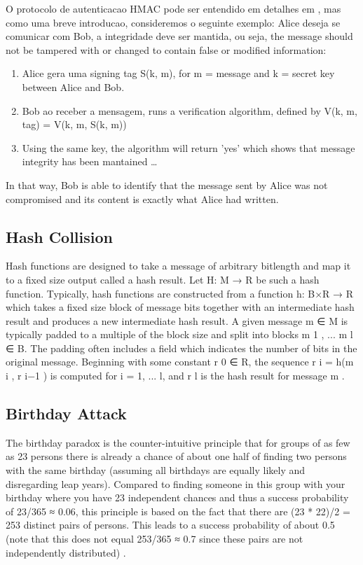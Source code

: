 \documentclass[letterpaper,conference]{IEEEtran}
\begin{document}
O protocolo de autenticacao HMAC pode ser entendido em detalhes em \cite{krawczyk1997hmac}, mas como uma breve
introducao, consideremos o seguinte exemplo: Alice deseja se comunicar com Bob, a integridade deve ser
mantida, ou seja, the message should not be tampered with or changed to contain false or modified information:
\begin{enumerate}
\item Alice gera uma signing tag S(k, m), for m = message and k = secret key between Alice and Bob.
\item Bob ao receber a mensagem, runs a verification algorithm, defined by V(k, m, tag) = V(k, m, S(k, m))
\item Using the same key, the algorithm will return 'yes' which shows that message integrity has been mantained \ldots
\end{enumerate}

In that way, Bob is able to identify that the message sent by Alice was not compromised and its content
is exactly what Alice had written.

\subsection{Hash Collision}

Hash functions are designed to take a message of arbitrary bitlength and map it to a fixed size
output called a hash result. Let H: M → R be such a hash function. Typically, hash functions are
constructed from a function h: B×R → R which takes a fixed size block of message bits together
with an intermediate hash result and produces a new intermediate hash result. A given message
m ∈ M is typically padded to a multiple of the block size and split into blocks m 1 , ... m l ∈ B. The
padding often includes a field which indicates the number of bits in the original message.
Beginning with some constant r 0 ∈ R, the sequence r i = h(m i , r i−1 ) is computed for i = 1, ... l, and
r l is the hash result for message m \cite{van1999parallel}.

\subsection{Birthday Attack}

The birthday paradox is the counter-intuitive principle that for
groups of as few as 23 persons there is already a chance of about one half of finding two 
persons with the same birthday (assuming all birthdays are equally likely and disregarding 
leap years). Compared to finding someone in this group with your birthday where you have 
23 independent chances and thus a success probability of 23/365 ≈ 0.06, this principle is 
based on the fact that there are (23 * 22)/2 = 253 distinct pairs of persons. This leads to 
a success probability of about 0.5 (note that this does not equal 253/365 ≈ 0.7 since these 
pairs are not independently distributed) \cite{stevens2012attacks}.
\end{document}
